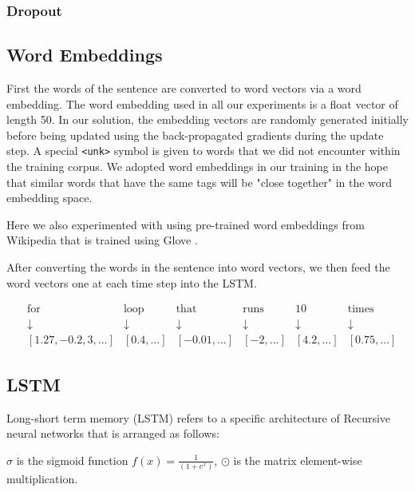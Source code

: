 \documentclass[fyp]{socreport}
\begin{document}
\subsubsection{Dropout}

\subsection{Word Embeddings}
First the words of the sentence are converted to word vectors via a word
embedding. The word embedding used in all our experiments is a float vector of
length 50. In our solution, the embedding vectors are randomly generated
initially before being updated using the back-propagated gradients during the
update step. A special \texttt{<unk>} symbol is given to words that we did not
encounter within the training corpus. We adopted word embeddings in our
training in the hope that similar words that have the same tags will be "close
together" in the word embedding space.

Here we also experimented with using pre-trained word embeddings from Wikipedia
that is trained using Glove \cite{pennington2014glove}.

After converting the words in the sentence into word vectors, we then feed the
word vectors one at each time step into the LSTM.

\begin{align*}
  &\text{for} &\text{loop } &\text{that } &\text{runs } &\text{10 } &\text{times } \\
  &\downarrow &\downarrow &\downarrow &\downarrow &\downarrow &\downarrow \\
  &[1.27, -0.2, 3, ...] &[0.4,...] &[-0.01, ...] &[-2, ...] &[4.2, ...] &[0.75, ...]
\end{align*}


\subsection{LSTM}
Long-short term memory (LSTM) refers to a specific architecture of Recursive
neural networks that is arranged as follows:


$\sigma$ is the sigmoid function $f(x) = \frac{1}{(1 + e^x)}$, $\odot$ is the
matrix element-wise multiplication.
\end{document}
